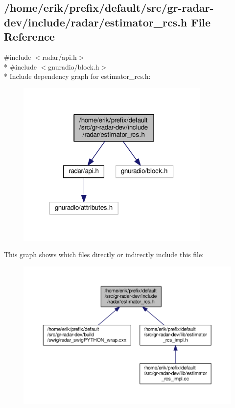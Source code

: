 \subsection{/home/erik/prefix/default/src/gr-\/radar-\/dev/include/radar/estimator\+\_\+rcs.h File Reference}
\label{estimator__rcs_8h}
{\ttfamily \#include $<$radar/api.\+h$>$}\\*
{\ttfamily \#include $<$gnuradio/block.\+h$>$}\\*
Include dependency graph for estimator\+\_\+rcs.\+h\+:
\nopagebreak
\begin{figure}[H]
\begin{center}
\leavevmode
\includegraphics[width=270pt]{d8/dae/estimator__rcs_8h__incl}
\end{center}
\end{figure}
This graph shows which files directly or indirectly include this file\+:
\nopagebreak
\begin{figure}[H]
\begin{center}
\leavevmode
\includegraphics[width=350pt]{d8/de5/estimator__rcs_8h__dep__incl}
\end{center}
\end{figure}
